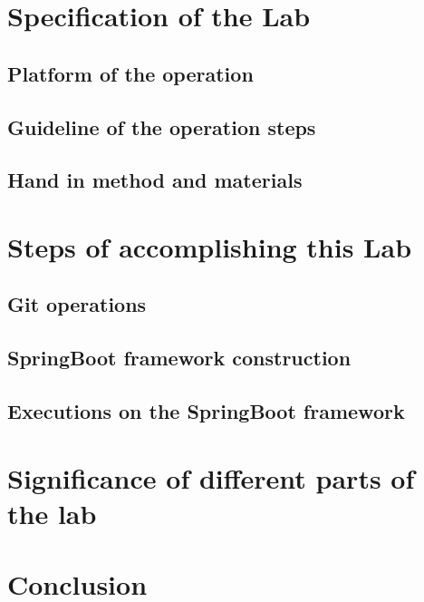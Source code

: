 \documentclass[a4paper]{report}
\begin{document}
\chapter{Specification of the Lab}
\section{Platform of the operation}
\section{Guideline of the operation steps}
\section{Hand in method and materials}
\chapter{Steps of accomplishing this Lab}
\section{Git operations}
\section{SpringBoot framework construction}
\section{Executions on the SpringBoot framework}
\chapter{Significance of different parts of the lab}
\chapter{Conclusion}
\end{document}
